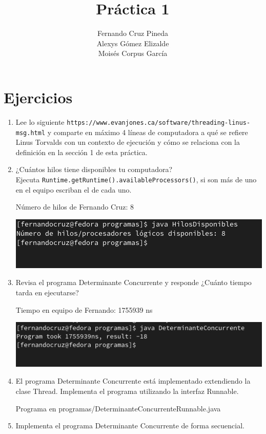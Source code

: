 \documentclass[12pt]{article}
\title{Práctica 1}
\author{Fernando Cruz Pineda \\ Alexys Gómez Elizalde \\ Moisés Corpus García}
\date{}
\begin{document}
\maketitle

\section*{Ejercicios}

\begin{enumerate}
    \item Lee lo siguiente \texttt{https://www.evanjones.ca/software/threading-linus-msg.html} y comparte en máximo 4 líneas de computadora a qué se refiere Linus Torvalds con un contexto de ejecución y cómo se relaciona con la definición en la sección 1 de esta práctica.
    \item ¿Cuántos hilos tiene disponibles tu computadora? \\
      Ejecuta \texttt{Runtime.getRuntime().availableProcessors()}, si son más de uno en el equipo escriban el de cada uno.

      Número de hilos de Fernando Cruz: 8

      \includegraphics[]{Fer.png}

    \item Revisa el programa Determinante Concurrente y responde ¿Cuánto tiempo tarda en ejecutarse?

      Tiempo en equipo de Fernando: 1755939 ns

      \includegraphics[]{Fer2.png}

      
    \item El programa Determinante Concurrente está implementado extendiendo la clase Thread. Implementa el programa utilizando la interfaz Runnable.

      Programa en programas/DeterminanteConcurrenteRunnable.java
      
    \item Implementa el programa Determinante Concurrente de forma secuencial.
      

\end{enumerate}
\end{document}
